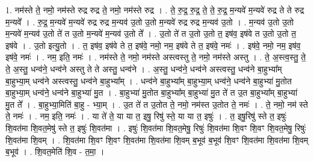 \documentclass[17pt]{extarticle}
\begin{document}
1. नम॑स्ते ते॒ नमो॒ नम॑स्ते रुद्र रुद्र ते॒ नमो॒ नम॑स्ते रुद्र । . ते॒ रु॒द्र॒ रु॒द्र॒ ते॒ ते॒ रु॒द्र॒ म॒न्यवे॑ म॒न्यवे॑ रुद्र ते ते रुद्र म॒न्यवे᳚ । . रु॒द्र॒ म॒न्यवे॑ म॒न्यवे॑ रुद्र रुद्र म॒न्यव॑ उ॒तो उ॒तो म॒न्यवे॑ रुद्र रुद्र म॒न्यव॑ उ॒तो । . म॒न्यव॑ उ॒तो उ॒तो म॒न्यवे॑ म॒न्यव॑ उ॒तो ते॑ त उ॒तो म॒न्यवे॑ म॒न्यव॑ उ॒तो ते᳚ । . उ॒तो ते॑ त उ॒तो उ॒तो त॒ इष॑व॒ इष॑वे त उ॒तो उ॒तो त॒ इष॑वे । . उ॒तो इत्यु॒तो । . त॒ इष॑व॒ इष॑वे ते त॒ इष॑वे॒ नमो॒ नम॒ इष॑वे ते त॒ इष॑वे॒ नमः॑ । . इष॑वे॒ नमो॒ नम॒ इष॑व॒ इष॑वे॒ नमः॑ । . नम॒ इति॒ नमः॑ । . नम॑स्ते ते॒ नमो॒ नम॑स्ते अस्त्वस्तु ते॒ नमो॒ नम॑स्ते अस्तु । . ते॒ अ॒स्त्व॒स्तु॒ ते॒ ते॒ अ॒स्तु॒ धन्व॑ने॒ धन्व॑ने अस्तु ते ते अस्तु॒ धन्व॑ने । . अ॒स्तु॒ धन्व॑ने॒ धन्व॑ने अस्त्वस्तु॒ धन्व॑ने बा॒हुभ्या᳚म् बा॒हुभ्या॒म् धन्व॑ने अस्त्वस्तु॒ धन्व॑ने बा॒हुभ्या᳚म् । . धन्व॑ने बा॒हुभ्या᳚म् बा॒हुभ्या॒म् धन्व॑ने॒ धन्व॑ने बा॒हुभ्या॑ मु॒तोत बा॒हुभ्या॒म् धन्व॑ने॒ धन्व॑ने बा॒हुभ्या॑ मु॒त । . बा॒हुभ्या॑ मु॒तोत बा॒हुभ्या᳚म् बा॒हुभ्या॑ मु॒त ते॑ त उ॒त बा॒हुभ्या᳚म् बा॒हुभ्या॑ मु॒त ते᳚ । . बा॒हुभ्या॒मिति॑ बा॒हु - भ्या॒म् । . उ॒त ते॑ त उ॒तोत ते॒ नमो॒ नम॑स्त उ॒तोत ते॒ नमः॑ । . ते॒ नमो॒ नम॑ स्ते ते॒ नमः॑ । . नम॒ इति॒ नमः॑ । . या ते॑ ते॒ या या त॒ इषु॒ रिषु॑ स्ते॒ या या त॒ इषुः॑ । . त॒ इषु॒रिषु॑ स्ते त॒ इषुः॑ शि॒वत॑मा शि॒वत॒मेषु॑ स्ते त॒ इषुः॑ शि॒वत॑मा । . इषुः॑ शि॒वत॑मा शि॒वत॒मेषु॒ रिषुः॑ शि॒वत॑मा शि॒वꣳ शि॒वꣳ शि॒वत॒मेषु॒ रिषुः॑ शि॒वत॑मा शि॒वम् । . शि॒वत॑मा शि॒वꣳ शि॒वꣳ शि॒वत॑मा शि॒वत॑मा शि॒वम् ब॒भूव॑ ब॒भूव॑ शि॒वꣳ शि॒वत॑मा शि॒वत॑मा शि॒वम् ब॒भूव॑ । . शि॒वत॒मेति॑ शि॒व - त॒मा॒ । \newline
\end{document}
